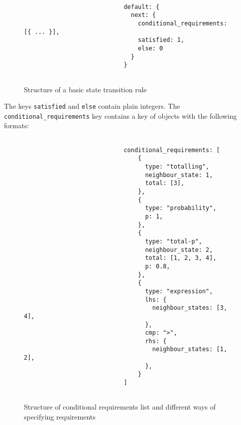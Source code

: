\begin{center}
\begin{figure}[H]
\begin{verbatim}
        
                            default: {
                              next: {
                                conditional_requirements: [{ ... }],
                                satisfied: 1,
                                else: 0
                              }
                            }
                
\end{verbatim}
\caption{Structure of a basic state transition rule}
\end{figure}
\end{center}
The keys \texttt{satisfied} and \texttt{else} contain plain integers. The \texttt{conditional\_requirements} key contains a key of objects with the following formats:
\begin{center}
\begin{figure}[H]
\begin{verbatim}
        
                            conditional_requirements: [
                                {
                                  type: "totalling",
                                  neighbour_state: 1,
                                  total: [3],
                                }, 
                                {
                                  type: "probability",
                                  p: 1,
                                },
                                {
                                  type: "total-p",
                                  neighbour_state: 2,
                                  total: [1, 2, 3, 4],
                                  p: 0.8,
                                },
                                {
                                  type: "expression",
                                  lhs: {
                                    neighbour_states: [3, 4],
                                  },
                                  cmp: ">",
                                  rhs: {
                                    neighbour_states: [1, 2],
                                  },
                                }
                            ]
                
\end{verbatim}
\caption{Structure of conditional requirements list and different ways of specifying requirements}
\label{condreqslist_example}
\end{figure}
\end{center}
